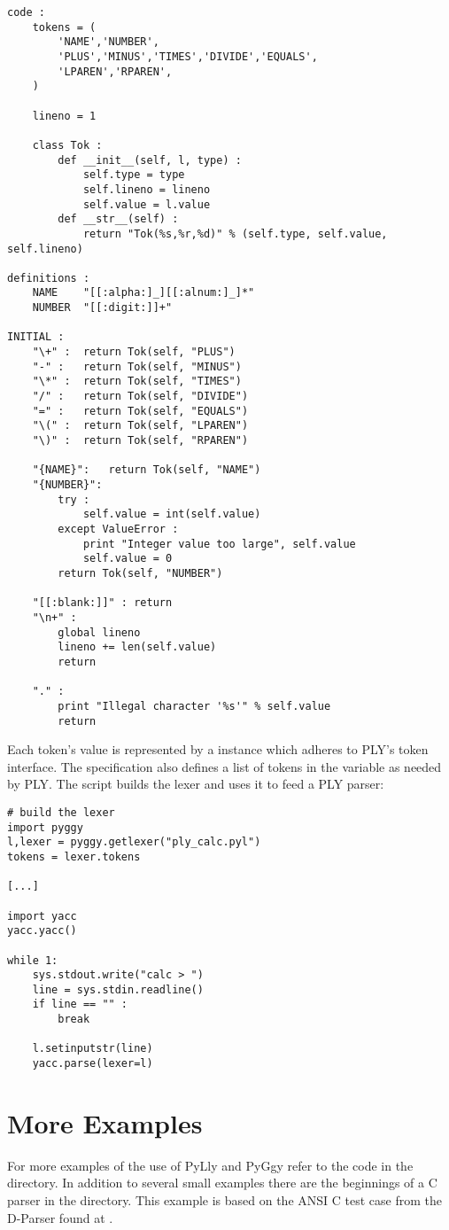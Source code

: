 \begin{verbatim}
code :
    tokens = (
        'NAME','NUMBER',
        'PLUS','MINUS','TIMES','DIVIDE','EQUALS',
        'LPAREN','RPAREN',
    )

    lineno = 1

    class Tok :
        def __init__(self, l, type) :
            self.type = type
            self.lineno = lineno
            self.value = l.value
        def __str__(self) :
            return "Tok(%s,%r,%d)" % (self.type, self.value, self.lineno)

definitions :
    NAME    "[[:alpha:]_][[:alnum:]_]*"
    NUMBER  "[[:digit:]]+"

INITIAL :
    "\+" :  return Tok(self, "PLUS")
    "-" :   return Tok(self, "MINUS")
    "\*" :  return Tok(self, "TIMES")
    "/" :   return Tok(self, "DIVIDE")
    "=" :   return Tok(self, "EQUALS")
    "\(" :  return Tok(self, "LPAREN")
    "\)" :  return Tok(self, "RPAREN")

    "{NAME}":   return Tok(self, "NAME")
    "{NUMBER}":
        try :
            self.value = int(self.value)
        except ValueError :
            print "Integer value too large", self.value
            self.value = 0
        return Tok(self, "NUMBER")

    "[[:blank:]]" : return
    "\n+" :
        global lineno
        lineno += len(self.value)
        return

    "." :
        print "Illegal character '%s'" % self.value
        return
\end{verbatim}

Each token's value is represented by a  instance
which adheres to PLY's token interface.  The specification
also defines a list of tokens in the  variable
as needed by PLY.  The  script
builds the lexer and uses it to feed a PLY parser:

\begin{verbatim}
# build the lexer
import pyggy
l,lexer = pyggy.getlexer("ply_calc.pyl")
tokens = lexer.tokens

[...]

import yacc
yacc.yacc()

while 1:
    sys.stdout.write("calc > ")
    line = sys.stdin.readline()
    if line == "" :
        break

    l.setinputstr(line)
    yacc.parse(lexer=l)
\end{verbatim}


\section{More Examples}
For more examples of the use of PyLly and PyGgy refer to the
code in the  directory.  In addition to several
small examples there are the beginnings of a C parser in the
 directory.  This example is based on
the ANSI C test case from the D-Parser found at
.

